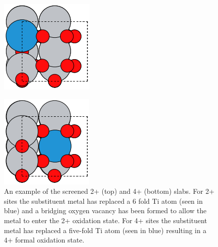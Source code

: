 \begin{figure}
    \centering
    \includegraphics[width=0.5\linewidth]{Images/ex_2+_slab.png}
    \label{fig:2+_ex_slab}

    \centering
    \includegraphics[width=0.5\linewidth]{Images/ex_4+_slab.png}
    \caption{An example of the screened 2+ (top) and 4+ (bottom) slabs. For 2+ sites the substituent metal has replaced a 6 fold Ti atom (seen in blue) and a bridging oxygen vacancy has been formed to allow the metal to enter the 2+ oxidation state.  For 4+ sites the substituent metal has replaced a five-fold Ti atom (seen in blue) resulting in a 4+ formal oxidation state.}%
    \label{fig:2+ex_slab}
\end{figure}


